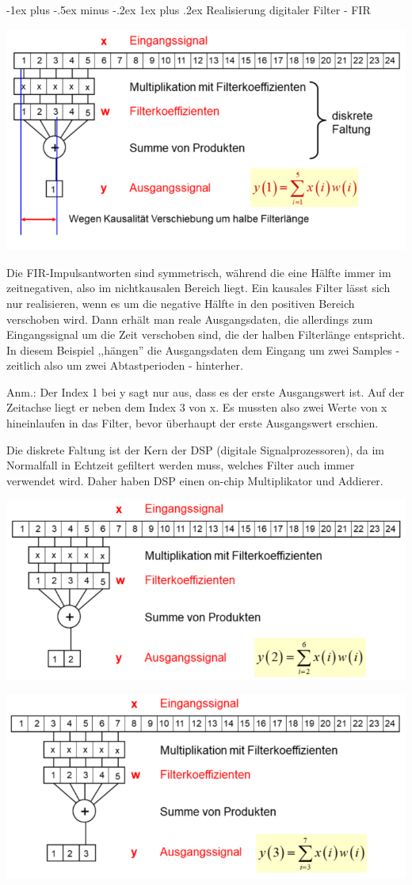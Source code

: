 \documentclass[a4paper]{article}
\makeatletter
\renewcommand{\subsubsection}{\@startsection{subsubsection}{3}{0mm}%
 {-1ex plus -.5ex minus -.2ex}%
 {1ex plus .2ex}%
 {\normalfont\small\bfseries}}
\makeatother
\begin{document}
\begin{multicols}{3}
  \subsubsection{Realisierung digitaler Filter - FIR}\label{realisierung-digitaler-filter---fir}
  \begin{itemize*}
    \item \includegraphics[width=.5\linewidth]{Assets/Biosignalverarbeitung-fir-realisierung.png}
    \item Die FIR-Impulsantworten sind symmetrisch, während die eine Hälfte immer im zeitnegativen, also im nichtkausalen Bereich liegt. Ein kausales Filter lässt sich nur realisieren, wenn es um die negative Hälfte in den positiven Bereich verschoben wird. Dann erhält man reale Ausgangsdaten, die allerdings zum Eingangssignal um die Zeit verschoben sind, die der halben Filterlänge entspricht. In diesem Beispiel ,,hängen'' die Ausgangsdaten dem Eingang um zwei Samples -zeitlich also um zwei Abtastperioden - hinterher.
    \item Anm.: Der Index 1 bei y sagt nur aus, dass es der erste Ausgangswert ist. Auf der Zeitachse liegt er neben dem Index 3 von x. Es mussten also zwei Werte von x hineinlaufen in das Filter, bevor überhaupt der erste Ausgangswert erschien.
    \item Die diskrete Faltung ist der Kern der DSP (digitale Signalprozessoren), da im Normalfall in Echtzeit gefiltert werden muss, welches Filter auch immer verwendet wird. Daher haben DSP einen on-chip Multiplikator und Addierer.
    \item \includegraphics[width=.5\linewidth]{Assets/Biosignalverarbeitung-fir-realisierung-2.png}
    \item \includegraphics[width=.5\linewidth]{Assets/Biosignalverarbeitung-fir-realisierung-3.png}

\end{itemize*}
\end{multicols}
\end{document}
